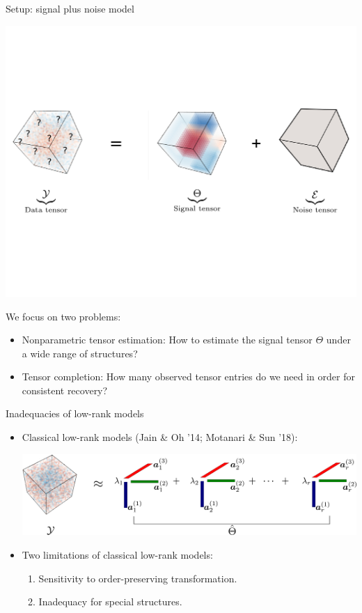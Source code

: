 \documentclass[10pt, mathserif]{beamer} %
\theoremstyle{definition}
\theoremstyle{plain}
\begin{document}
\begin{frame}{Setup: signal plus noise model}
     \begin{center}
    \includegraphics[width =\textwidth]{Figures/signalnoise.pdf}
    \end{center}
    We focus on two problems:
    \begin{itemize}
        \item Nonparametric tensor estimation: How to estimate the signal tensor $\Theta$ under {\color{red}a wide range of structures}?
        \item Tensor completion: How many {\color{red}observed tensor entries} do we need in order for consistent recovery?
    \end{itemize}
\end{frame}

\begin{frame}{Inadequacies of low-rank models}
 \begin{itemize}
 \item Classical low-rank models (Jain \& Oh '14; Motanari \& Sun '18):
 \\[.5cm]

   \begin{center}
    \includegraphics[width =\textwidth]{Figures/classic.pdf}
    \end{center}

     \item Two limitations of classical low-rank models:
     \begin{enumerate}
         \item Sensitivity to order-preserving transformation.
         \item Inadequacy for special structures.
     \end{enumerate}
 \end{itemize}
\end{frame}
\end{document}

